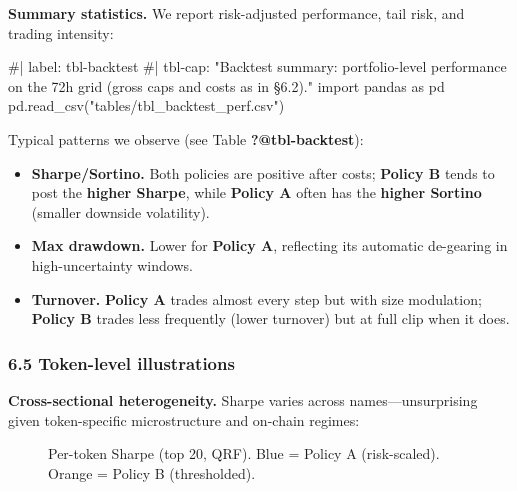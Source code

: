 \documentclass[
  a4paper,
  DIV=11,
  numbers=noendperiod]{scrreprt}
\newenvironment{Shaded}{\begin{snugshade}}{\end{snugshade}}
\newcommand{\CommentTok}[1]{\textcolor[rgb]{0.37,0.37,0.37}{#1}}
\newcommand{\ImportTok}[1]{\textcolor[rgb]{0.00,0.46,0.62}{#1}}
\newcommand{\NormalTok}[1]{\textcolor[rgb]{0.00,0.23,0.31}{#1}}
\newcommand{\StringTok}[1]{\textcolor[rgb]{0.13,0.47,0.30}{#1}}
\providecommand{\tightlist}{%
  \setlength{\itemsep}{0pt}\setlength{\parskip}{0pt}}
\begin{document}
\textbf{Summary statistics.} We report risk-adjusted performance, tail
risk, and trading intensity:

\begin{Shaded}
\begin{Highlighting}[]
\CommentTok{\#| label: tbl{-}backtest}
\CommentTok{\#| tbl{-}cap: "Backtest summary: portfolio{-}level performance on the 72h grid (gross caps and costs as in §6.2)."}
\ImportTok{import}\NormalTok{ pandas }\ImportTok{as}\NormalTok{ pd}
\NormalTok{pd.read\_csv(}\StringTok{"tables/tbl\_backtest\_perf.csv"}\NormalTok{)}
\end{Highlighting}
\end{Shaded}

Typical patterns we observe (see Table \textbf{?@tbl-backtest}):

\begin{itemize}
\tightlist
\item
  \textbf{Sharpe/Sortino.} Both policies are positive after costs;
  \textbf{Policy B} tends to post the \textbf{higher Sharpe}, while
  \textbf{Policy A} often has the \textbf{higher Sortino} (smaller
  downside volatility).
\item
  \textbf{Max drawdown.} Lower for \textbf{Policy A}, reflecting its
  automatic de-gearing in high-uncertainty windows.
\item
  \textbf{Turnover.} \textbf{Policy A} trades almost every step but with
  size modulation; \textbf{Policy B} trades less frequently (lower
  turnover) but at full clip when it does.
\end{itemize}

\subsubsection{6.5 Token-level
illustrations}\label{token-level-illustrations}

\textbf{Cross-sectional heterogeneity.} Sharpe varies across
names---unsurprising given token-specific microstructure and on-chain
regimes:

\begin{figure}


\caption{\label{fig-token-sharpe}Per-token Sharpe (top 20, QRF). Blue =
Policy A (risk-scaled). Orange = Policy B (thresholded).}

\end{figure}%
\end{document}
